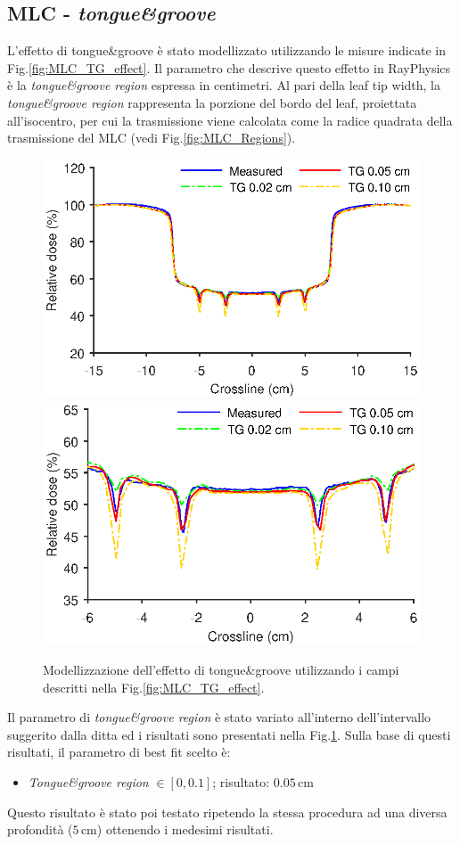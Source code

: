 \subsection{MLC - \textit{tongue\&{}groove}}
L'effetto di tongue\&{}groove è stato modellizzato utilizzando le misure indicate in Fig.\ref{fig:MLC_TG_effect}. Il parametro che descrive questo effetto in RayPhysics è la \textit{tongue\&{}groove region} espressa in centimetri. Al pari della leaf tip width, la \textit{tongue\&{}groove region} rappresenta la porzione del bordo del leaf, proiettata all'isocentro, per cui la trasmissione viene calcolata come la radice quadrata della trasmissione del MLC (vedi Fig.\ref{fig:MLC_Regions}). 
\begin{figure}[!t]
\centering
\includegraphics[width=.49\textwidth]{./cap2/MLC_Plots/TG/TG_modeling.eps}
\includegraphics[width=.49\textwidth]{./cap2/MLC_Plots/TG/TG_modelingZOOM.eps}
\caption{Modellizzazione dell'effetto di tongue\&{}groove utilizzando i campi descritti nella Fig.\ref{fig:MLC_TG_effect}.}
\label{fig:MLC_TG_modeling}
\end{figure}

Il parametro di \textit{tongue\&{}groove region} è stato variato all'interno dell'intervallo suggerito dalla ditta ed i risultati sono presentati nella Fig.\ref{fig:MLC_TG_modeling}. Sulla base di questi risultati, il parametro di best fit scelto è:
\begin{itemize}
\item \textit{Tongue\&{}groove region} $\in [0, 0.1]$; risultato: $0.05\,$cm
\end{itemize}
Questo risultato è stato poi testato ripetendo la stessa procedura ad una diversa profondità ($5\,$cm) ottenendo i medesimi risultati.\\


